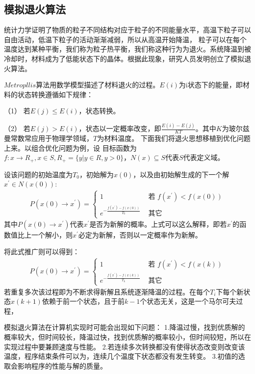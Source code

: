 \subsection{模拟退火算法}
统计力学证明了物质的粒子不同结构对应于粒子的不同能量水平，高温下粒子可以自由活动，低温下粒子的活动渐渐减弱，所以从高温开始降温，
粒子可以在每个温度达到某种平衡，我们称为粒子热平衡，我们称这种行为为退火。系统降温到被冷却时，材料成为了低能状态下的晶体。根据此现象，研究人员发明创立了模拟退火算法。
\par
$Metropllis$算法用数学模型描述了材料退火的过程。$E(i)$为i状态下的能量，即材料的状态转换遵循如下规律：
\par
（1） 若$E(j) \le E(i) $，状态转换。
\par
（2） 若$E(j) > E(i)$，状态以一定概率改变，即$\frac{E(i)-E(j)}{KT}$。其中$K$为玻尔兹曼常数常应用于物理学领域，$T$为材料温度。
下面我们将退火思想移植到优化问题上来。以组合优化问题为例，设
目标函数为$f:x \rightarrow R_{+},x \in S,R_{+} = \{y|y \in R,y > 0\}$，$N(x) \subseteq S$代表$S$代表定义域。
\par
设该问题的初始温度为$T_0$，初始解为$x(0)$，以及由初始解生成的下一个解$x^{'} \in N(x(0))$:
\begin{align}
    P\left(x(0) \rightarrow x^{\prime}\right)=\left\{\begin{array}{ll}
        1 & \text { 若 } f\left(x^{\prime}\right)<f(x(0)) \\
        e^{-\frac{f\left(x^{'}\right)-f(x(0))}{T_{0}}} & \text { 其它 }
        \end{array}\right.
\end{align}
其中$P\left(x(0) \rightarrow x^{\prime}\right)$代表$x^{'}$是否为新解的概率。上式可以这么解释，即若$x^{'}$的函数值比上一个解小，则$x^{'}$必定为新解，否则以一定概率作为新解。
\par
将此式推广则可以得到：
\begin{align}
    P\left(x(0) \rightarrow x^{\prime}\right)=\left\{\begin{array}{ll}
        1 & \text { 若 } f\left(x^{\prime}\right)<f(x(k)) \\
        e^{-\frac{f\left(x^{'}\right)-f(x(k))}{T_{k}}} & \text { 其它 }
        \end{array}\right.
        \label{thddgs}%
\end{align}
若重复多次该过程即为不断求得新解且系统逐渐降温的过程。在每个$T_i$下每个新状态$x(k+1)$依赖于前一个状态，且于前$k-1$个状态无关，这是一个马尔可夫过程，
\par
模拟退火算法在计算机实现时可能会出现如下问题：
1.降温过慢，找到优质解的概率较大，但时间较长，降温过快，找到优质解的概率较小，但时间较短，所以在实现过程中要兼顾速度与性能。
2.若连续多次转换都没有使得状态改变则改变该温度，程序结束条件可以为，连续几个温度下状态都没有发生转变。
3.初值的选取会影响程序的性能与解的质量。
